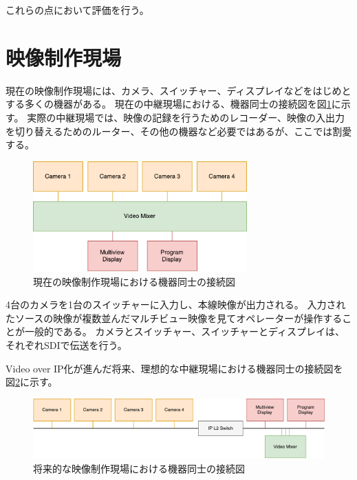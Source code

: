 これらの点において評価を行う。

\section{映像制作現場}

現在の映像制作現場には、カメラ、スイッチャー、ディスプレイなどをはじめとする多くの機器がある。
現在の中継現場における、機器同士の接続図を図\ref{fig:broadcast-diagram-on-sdi}に示す。
実際の中継現場では、映像の記録を行うためのレコーダー、映像の入出力を切り替えるためのルーター、その他の機器など必要ではあるが、ここでは割愛する。

\begin{figure}[htbp]
  \begin{center}
    \includegraphics[bb=0 0 432 222,width=8.233cm]{img/broadcast-diagram-on-sdi.pdf}
  \end{center}
  \caption{現在の映像制作現場における機器同士の接続図}
  \label{fig:broadcast-diagram-on-sdi}
\end{figure}

4台のカメラを1台のスイッチャーに入力し、本線映像が出力される。
入力されたソースの映像が複数並んだマルチビュー映像を見てオペレーターが操作することが一般的である。
カメラとスイッチャー、スイッチャーとディスプレイは、それぞれSDIで伝送を行う。

Video over IP化が進んだ将来、理想的な中継現場における機器同士の接続図を図\ref{fig:broadcast-diagram-on-ip}に示す。

\begin{figure}[htbp]
  \begin{center}
    \includegraphics[bb=0 0 787 161,width=15cm]{img/broadcast-diagram-on-ip.pdf}
  \end{center}
  \caption{将来的な映像制作現場における機器同士の接続図}
  \label{fig:broadcast-diagram-on-ip}
\end{figure}

